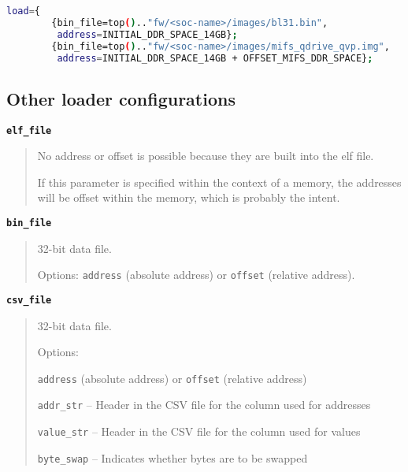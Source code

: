 \small
\begin{lstlisting}[language=bash]
    load={
        {bin_file=top().."fw/<soc-name>/images/bl31.bin",
         address=INITIAL_DDR_SPACE_14GB};
        {bin_file=top().."fw/<soc-name>/images/mifs_qdrive_qvp.img",
         address=INITIAL_DDR_SPACE_14GB + OFFSET_MIFS_DDR_SPACE};
\end{lstlisting}
\normalsize

\clearpage
\subsection{Other loader configurations}

{\textbf {\footnotesize{\lstinline!elf_file!}}}
\vspace{-2pt}
\begin{quote}
No address or offset is possible because they are built into the elf file.

If this parameter is specified within the context of a memory, the addresses will be offset within the memory, which is probably the intent.
\end{quote}

{\textbf {\footnotesize{\lstinline!bin_file!}}}
\vspace{-2pt}
\begin{quote}
32-bit data file.

Options: {\small{\lstinline!address!}} (absolute address) or {\small{\lstinline!offset!}} (relative address).
\end{quote}


{\textbf {\footnotesize{\lstinline!csv_file!}}}
\vspace{-2pt}
\begin{quote}
32-bit data file.

Options:
\begin{itemize1}
\item {\small{\lstinline!address!}} (absolute address) or {\small{\lstinline!offset!}} (relative address)
\item {\small{\lstinline!addr_str!}}  -- Header in the CSV file for the column used for addresses
\item {\small{\lstinline!value_str!}} -- Header in the CSV file for the column used for values
\item {\small{\lstinline!byte_swap!}} -- Indicates whether bytes are to be swapped
\end{itemize1}
\end{quote}


